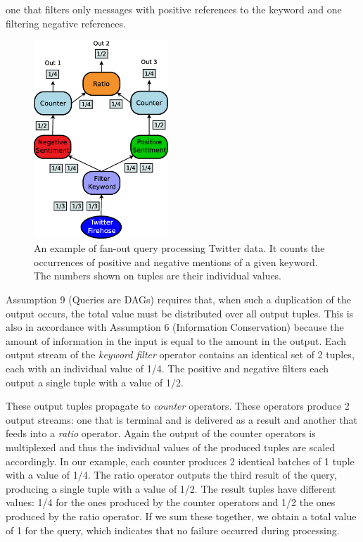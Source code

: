one that filters only messages with positive references to the keyword and one filtering negative
references.
\clearpage
\begin{figure}[t]
	\centering
	\includegraphics[width=0.45\textwidth]{img/tesi/fan-out_2} 
	\caption{An example of fan-out query processing Twitter data. It counts the occurrences of positive and
	negative mentions of a given keyword. The numbers shown on tuples are their individual \sic values.}
	\label{fig:query_fanout}
\end{figure}

Assumption 9 (Queries are DAGs) requires that, when such a duplication of the
output occurs, the total \sic value must be distributed over all output tuples. This is also in
accordance with Assumption 6 (Information Conservation) because the amount of information in the input is
equal to the amount in the output.
Each output stream of the \emph{keyword filter} operator contains an identical set of 2
tuples, each with an individual \sic value of 1/4.
The positive and negative filters each output a single tuple with a \sic value of 1/2. 

These output tuples propagate to \emph{counter} operators. These operators produce 2 output
streams: one that is terminal and is delivered as a result and another that feeds into a \emph{ratio}
operator.
Again the output of the counter operators is multiplexed and thus the individual \sic values of
the produced tuples are scaled accordingly. In our example, each counter produces 2 identical batches of
1 tuple with a \sic value of 1/4. The ratio operator outputs the third result of the query, producing a
single tuple with a \sic value of 1/2.
The result tuples have different \sic values: 1/4 for the
ones produced by the counter operators and 1/2 the ones produced by the ratio operator. If we sum
these together, we obtain a total \sic value of 1 for the query, which indicates that
no failure occurred during processing. 


